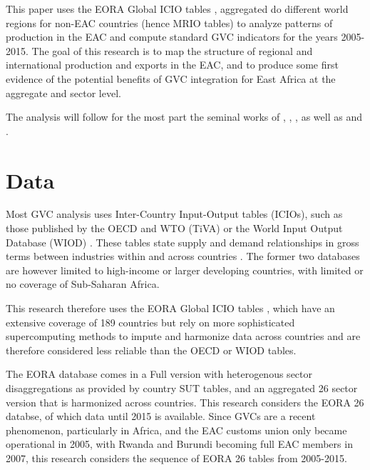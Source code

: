 \documentclass[a4paper]{article}
\begin{document}
This paper uses the EORA Global ICIO tables \citet{lenzen2012mapping, lenzen2013building}, aggregated do different world regions for non-EAC countries (hence MRIO tables) to analyze patterns of production in the EAC and compute standard GVC indicators for the years 2005-2015. The goal of this research is to map the structure of regional and international production and exports in the EAC, and to produce some first evidence of the potential benefits of GVC integration for East Africa at the aggregate and sector level. \newline

The analysis will follow for the most part the seminal works of \citet{hummels2001nature}, \citet{koopman2014tracing}, \citet{wang2013quantifying}, as well as \citet{Kummritz20161} and \citet{Kummritz20162}. 

\section{Data}
Most GVC analysis uses Inter-Country Input-Output tables (ICIOs), such as those
published by the OECD and WTO (TiVA) or the World Input Output Database (WIOD)  \citep{timmer2012world}. These tables state supply and demand relationships in gross terms between industries within and across countries \citep{Kummritz2014}. The former two databases are however limited to high-income or larger developing countries, with limited or no coverage of Sub-Saharan Africa. \newline

This research therefore uses the EORA Global ICIO tables \citep{lenzen2012mapping, lenzen2013building}, which have an extensive coverage of 189 countries but rely on more sophisticated supercomputing methods to impute and harmonize data across countries and are therefore considered less reliable than the OECD or WIOD tables. \newline

The EORA database comes in a Full version with heterogenous sector disaggregations as provided by country SUT tables, and an aggregated 26 sector version that is harmonized across countries. This research considers the EORA 26 databse, of which data until 2015 is available. Since GVCs are a recent phenomenon, particularly in Africa, and the EAC customs union only became operational in 2005, with Rwanda and Burundi becoming full EAC members in 2007, this research considers the sequence of EORA 26 tables from 2005-2015. \newline
\end{document}
